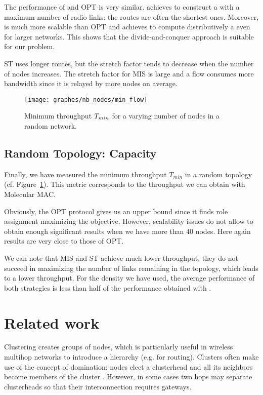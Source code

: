 \documentclass[twoside]{article}
\begin{document}
The performance of \potatoes and OPT is very similar. \potatoes
achieves to construct a \rwcds with a maximum number of radio links:
the routes are often the shortest ones. Moreover, \potatoes is much
more scalable than OPT and achieves to compute distributively a \rwcds
even for larger networks. This shows that the divide-and-conquer approach
is suitable for our problem.

ST uses longer routes, but the stretch factor tends to decrease when
the number of nodes increases. The stretch factor for MIS is large and
a flow consumes more bandwidth since it is relayed by more nodes on
average.

\begin{figure}[!h]
\centering
	\texttt{[image: graphes/nb\_nodes/min\_flow]}        
	\caption{Minimum throughput $T_{min}$ for a varying number
          of nodes in a random network.} 
\label{fig:nb_nodes-min_flow}
\end{figure}


\subsection{Random Topology:  Capacity}

Finally, we have measured the minimum throughput $T_{min}$ in a random
topology (cf. Figure~\ref{fig:nb_nodes-min_flow}). This metric
corresponds to the throughput we can obtain with Molecular MAC.

Obviously, the OPT protocol gives us an upper bound since it finds
role assignment maximizing the objective. However, scalability issues
do not allow to obtain enough significant results when we have more
than $40$ nodes. Here again \potatoes results are very close to those
of OPT.

We can note that MIS and ST achieve much lower throughput: they do not
succeed in maximizing the number of links remaining in the \rwcds
topology, which leads to a lower throughput.  For the density we have used,
the average performance of both strategies is less than half of the
performance obtained with \potatoes.








\section{Related work}
\label{section:related_work}

Clustering creates groups of nodes, which is particularly useful in
wireless multihop networks to introduce a hierarchy (e.g. for
routing). Clusters often make use of the concept of domination: nodes
elect a clusterhead and all its neighbors become members of the
cluster \cite{lin97}. However, in some cases two hops may separate
clusterheads so that their interconnection requires gateways.
\end{document}
